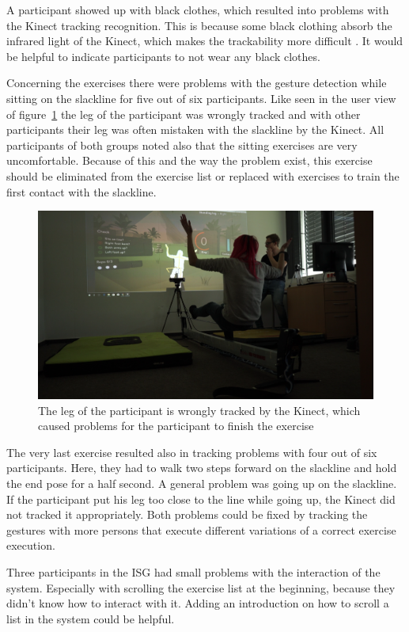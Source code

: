 A participant showed up with black clothes, which resulted into problems with the Kinect tracking recognition.
This is because some black clothing absorb the infrared light of the Kinect, which makes the trackability more difficult \cite{KinectBlackClothing}.
It would be helpful to indicate participants to not wear any black clothes.

Concerning the exercises there were problems with the gesture detection while sitting on the slackline for five out of six participants.
Like seen in the user view of figure~\ref{fig:6_5_sittingProblems} the leg of the participant was wrongly tracked and with other participants their leg was often mistaken with the slackline by the Kinect.
All participants of both groups noted also that the sitting exercises are very uncomfortable.
Because of this and the way the problem exist, this exercise should be eliminated from the exercise list or replaced with exercises to train the first contact with the slackline.
\begin{figure}[htb]
	\centering
	\includegraphics[width=0.88\linewidth]{Pictures/6_5_sitting}
	\caption{The leg of the participant is wrongly tracked by the Kinect, which caused problems for the participant to finish the exercise}
	\label{fig:6_5_sittingProblems}
\end{figure}

The very last exercise resulted also in tracking problems with four out of six participants.
Here, they had to walk two steps forward on the slackline and hold the end pose for a half second.
A general problem was going up on the slackline.
If the participant put his leg too close to the line while going up, the Kinect did not tracked it appropriately.
Both problems could be fixed by tracking the gestures with more persons that execute different variations of a correct exercise execution.

Three participants in the ISG had small problems with the interaction of the system.
Especially with scrolling the exercise list at the beginning, because they didn't know how to interact with it.
Adding an introduction on how to scroll a list in the system could be helpful.

